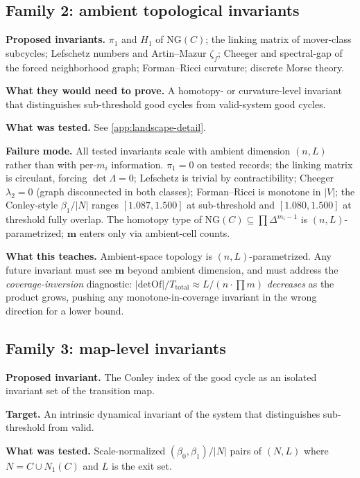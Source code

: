 \documentclass[11pt,a4paper]{article}
\theoremstyle{plain}
\theoremstyle{definition}
\newcommand{\NGset}{\mathrm{NG}}
\newcommand{\detOf}{\mathrm{detOf}}
\begin{document}
\subsection{Family 2: ambient topological invariants}\label{sec:landscape-ambient}

\textbf{Proposed invariants.} $\pi_1$ and $H_1$ of $\NGset(C)$; the
linking matrix of mover-class subcycles; Lefschetz numbers and
Artin--Mazur $\zeta_f$; Cheeger and spectral-gap of the forced
neighborhood graph; Forman--Ricci curvature; discrete Morse theory.

\textbf{What they would need to prove.} A homotopy- or curvature-level
invariant that distinguishes sub-threshold good cycles from
valid-system good cycles.

\textbf{What was tested.} See \cref{app:landscape-detail}.

\textbf{Failure mode.} All tested invariants scale with ambient
dimension $(n, L)$ rather than with per-$m_i$ information.  $\pi_1 = 0$
on tested records; the linking matrix is circulant, forcing
$\det \Lambda = 0$; Lefschetz is trivial by contractibility; Cheeger
$\lambda_2 = 0$ (graph disconnected in both classes); Forman--Ricci is
monotone in $|V|$; the Conley-style $\beta_1 / |N|$ ranges
$[1.087, 1.500]$ at sub-threshold and $[1.080, 1.500]$ at threshold
fully overlap.  The homotopy type of $\NGset(C) \subseteq \prod \Delta^{m_i - 1}$
is $(n, L)$-parametrized; $\mathbf{m}$ enters only via ambient-cell
counts.

\textbf{What this teaches.} Ambient-space topology is
$(n, L)$-parametrized.  Any future invariant must see $\mathbf{m}$
beyond ambient dimension, and must address the
\emph{coverage-inversion} diagnostic: $|\detOf| / T_{\mathrm{total}}
\approx L / (n \cdot \prod m)$ \emph{decreases} as the product grows,
pushing any monotone-in-coverage invariant in the wrong direction for
a lower bound.

\subsection{Family 3: map-level invariants}\label{sec:landscape-map}

\textbf{Proposed invariant.} The Conley index of the good cycle as an
isolated invariant set of the transition map.

\textbf{Target.} An intrinsic dynamical invariant of the system that
distinguishes sub-threshold from valid.

\textbf{What was tested.} Scale-normalized $(\beta_0, \beta_1) / |N|$
pairs of $(N, L)$ where $N = C \cup N_1(C)$ and $L$ is the exit set.
\end{document}
